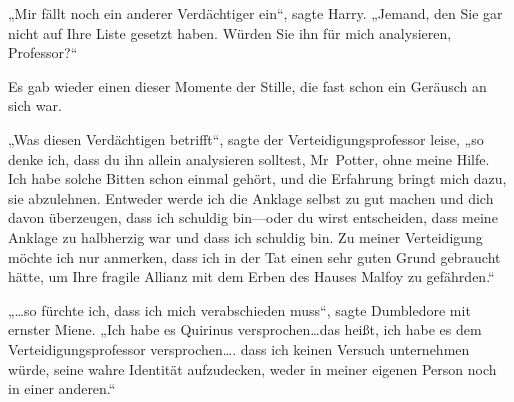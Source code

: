 „Mir fällt noch ein anderer Verdächtiger ein“, sagte Harry. „Jemand, den Sie gar nicht auf Ihre Liste gesetzt haben. Würden Sie ihn für mich analysieren, Professor?“

Es gab wieder einen dieser Momente der Stille, die fast schon ein Geräusch an sich war.

„Was diesen Verdächtigen betrifft“, sagte der Verteidigungsprofessor leise, „so denke ich, dass du ihn allein analysieren solltest, Mr~Potter, ohne meine Hilfe. Ich habe solche Bitten schon einmal gehört, und die Erfahrung bringt mich dazu, sie abzulehnen. Entweder werde ich die Anklage selbst zu gut machen und dich davon überzeugen, dass ich schuldig bin—oder du wirst entscheiden, dass meine Anklage zu halbherzig war und dass ich schuldig bin. Zu meiner Verteidigung möchte ich nur anmerken, dass ich in der Tat einen sehr guten Grund gebraucht hätte, um Ihre fragile Allianz mit dem Erben des Hauses Malfoy zu gefährden.“


„…so fürchte ich, dass ich mich verabschieden muss“, sagte Dumbledore mit ernster Miene. „Ich habe es Quirinus versprochen…das heißt, ich habe es dem Verteidigungsprofessor versprochen…. dass ich keinen Versuch unternehmen würde, seine wahre Identität aufzudecken, weder in meiner eigenen Person noch in einer anderen.“

